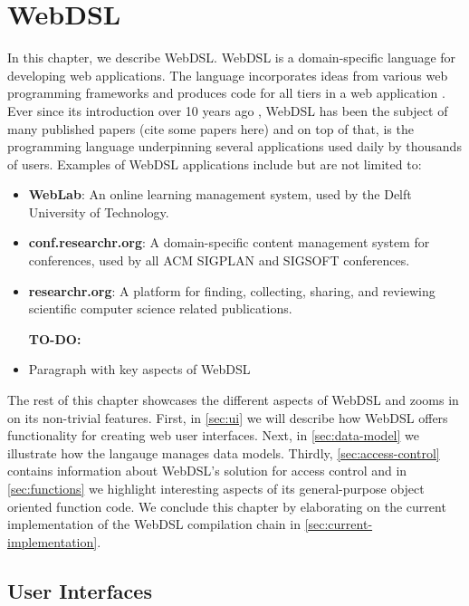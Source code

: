 
\chapter{\label{chap:webdsl}WebDSL}

  In this chapter, we describe WebDSL. WebDSL is a domain-specific language for developing web applications. The language incorporates ideas from various web programming frameworks and produces code for all tiers in a web application \autocite{Groenewegen2020}. Ever since its introduction over 10 years ago \autocite{Visser2007}, WebDSL has been the subject of many published papers (cite some papers here) and on top of that, is the programming language underpinning several applications used daily by thousands of users. Examples of WebDSL applications include but are not limited to:
  \begin{itemize}
    \item \textbf{WebLab}: An online learning management system, used by the Delft University of Technology.
    \item \textbf{conf.researchr.org}: A domain-specific content management system for conferences, used by all ACM SIGPLAN and SIGSOFT conferences.
    \item \textbf{researchr.org}: A platform for finding, collecting, sharing, and reviewing scientific computer science related publications.
  \end{itemize}

  \begin{itemize}
    \item [\textbf{TO-DO:}]
    \item Paragraph with key aspects of WebDSL
  \end{itemize}

  The rest of this chapter showcases the different aspects of WebDSL and zooms in on its non-trivial features. First, in \cref{sec:ui} we will describe how WebDSL offers functionality for creating web user interfaces. Next, in \cref{sec:data-model} we illustrate how the langauge manages data models. Thirdly, \cref{sec:access-control} contains information about WebDSL's solution for access control and in \cref{sec:functions} we highlight interesting aspects of its general-purpose object oriented function code. We conclude this chapter by elaborating on the current implementation of the WebDSL compilation chain in \cref{sec:current-implementation}.

  \section{\label{sec:ui}User Interfaces}

